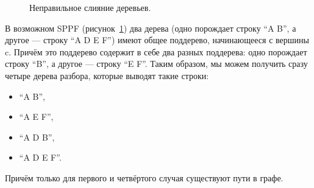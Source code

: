 \begin{figure}[t]
{    }
    \qquad
\caption{Неправильное слияние деревьев.}
\label{sppf_proof_incorrect}
\end{figure}

В возможном SPPF (рисунок~\ref{sppf_proof_incorrect}) два дерева (одно порождает строку ``A B'', а другое --- строку ``A D E F'') имеют общее поддерево, начинающееся с вершины c. Причём это поддерево содержит в себе два разных поддерева: одно порождает строку ``B'', а другое --- строку ``E F''. Таким образом, мы можем получить сразу четыре дерева разбора, которые выводят такие строки:
\begin{itemize}
\item ``A B'',
\item ``A E F'',
\item ``A D B'',
\item ``A D E F''.
\end{itemize}

Причём только для первого и четвёртого случая существуют пути в графе. 

